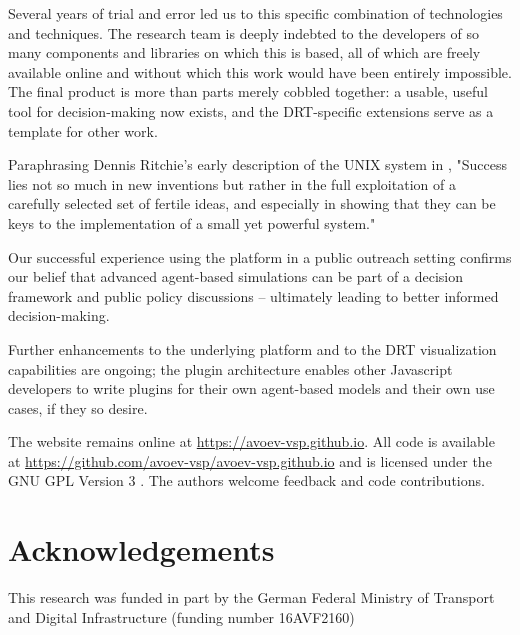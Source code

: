 \documentclass[3p,times,procedia]{elsarticle}
\begin{document}
Several years of trial and error led us to this specific combination of technologies and techniques. The research team is deeply indebted to the developers of so many components and libraries on which this is based, all of which are freely available online and without which this work would have been entirely impossible. The final product is more than parts merely cobbled together: a usable, useful tool for decision-making now exists, and the DRT-specific extensions serve as a template for other work.

Paraphrasing Dennis Ritchie's early description of the UNIX system in \citet{Ritchie1978}, "Success lies not so much in new inventions but rather in the full exploitation of a carefully selected set of fertile ideas, and especially in showing that they can be keys to the implementation of a small yet powerful system."

Our successful experience using the platform in a public outreach setting confirms our belief that advanced agent-based simulations can be part of a decision framework and public policy discussions -- ultimately leading to better informed decision-making.

Further enhancements to the underlying platform and to the DRT visualization capabilities are ongoing; the plugin architecture enables other Javascript developers to write plugins for their own agent-based models and their own use cases, if they so desire.

The website remains online at \url{https://avoev-vsp.github.io}. All code is available at \url{https://github.com/avoev-vsp/avoev-vsp.github.io} and is licensed under the GNU GPL Version 3 \cite{FSF2007GnuGPL}. The authors welcome feedback and code contributions.

\section{Acknowledgements}
This research was funded in part by the German Federal Ministry of Transport and Digital Infrastructure (funding number 16AVF2160)






\end{document}
